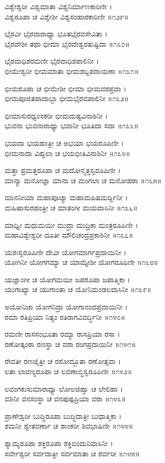 ವಿಶ್ವೇಶ್ವರೀ ವಿಶ್ವಮಾತಾ ವಿಶ್ವನಿರ್ಮಾಣಕಾರಿಣೀ ।\\
ವಿಶ್ವರೂಪಾ ಚ ವಿಶ್ವೇಶೀ ವಿಶ್ವಸಂಹಾರಕಾರಿಣೀ ॥೧೨೯॥

ಭೈರವೀ ಭೈರವಾರಾಧ್ಯಾ ಭೂತಭೈರವಸೇವಿತಾ ।\\
ಭೈರವೇಶೀ ತಥಾ ಭೀಮಾ ಭೈರವೇಶ್ವರತುಷ್ಟಿದಾ ॥೧೩೦॥

ಭೈರವಾಧಿಶರಮಣೀ ಭೈರವಾಧಿಶಪಾಲಿನೀ ।\\
ಭೀಮೇಶ್ವರೀ ಭೀಮಮಾತಾ ಭೀಮಶಬ್ದಪರಾಯಣಾ ॥೧೩೧॥

ಭೀಮರೂಪಾ ಚ ಭೀಮೇಶೀ ಭೀಮಾ ಭೀಮವರಪ್ರದಾ ।\\
ಭೀಮಪೂಜಿತಪಾದಾಬ್ಜಾ ಭೀಮಭೈರವಪಾಲಿನೀ ॥೧೩೨॥

ಭೀಮಾಸುರಧ್ವಂಸಕರೀ ಭೀಮದುಷ್ಟವಿನಾಶಿನೀ ।\\
ಭುವನಾ ಭುವನಾರಾಧ್ಯಾ ಭವಾನೀ ಭೂತಿದಾ ಸದಾ ॥೧೩೩॥

ಭಯದಾ ಭಯಹಂತ್ರೀ ಚ ಅಭಯಾ ಭಯರೂಪಿಣೀ ।\\
ಭೀಮನಾದಾ ವಿಹ್ವಲಾ ಚ ಭಯಭೀತಿವಿನಾಶಿನೀ ॥೧೩೪॥

ಮತ್ತಾ ಪ್ರಮತ್ತರೂಪಾ ಚ ಮದೋನ್ಮತ್ತಸ್ವರೂಪಿಣೀ ।\\
ಮಾನ್ಯಾ ಮನೋಜ್ಞಾ ಮಾನಾ ಚ ಮಂಗಲಾ ಚ ಮನೋಹರಾ ॥೧೩೫॥

ಮಾನನೀಯಾ ಮಹಾಪೂಜ್ಯಾ ಮಹಾಮಹಿಷಮರ್ದ್ದಿನೀ ।\\
ಮಹಿಷಾಸುರಹಂತ್ರೀ ಚ ಮಾತಂಗೀ ಮಯವಾಸಿನೀ ॥೧೩೬॥

ಮಾಧ್ವೀ ಮಧುಮಯೀ ಮುದ್ರಾ ಮುದ್ರಿಕಾ ಮಂತ್ರರೂಪಿಣೀ ।\\
ಮಹಾವಿಶ್ವೇಶ್ವರೀ ದೂತೀ ಮೌಲಿಚಂದ್ರಪ್ರಕಾಶಿನೀ ॥೧೩೭॥

ಯಶಃಸ್ವರೂಪಿಣೀ ದೇವೀ ಯೋಗಮಾರ್ಗಪ್ರದಾಯಿನೀ ।\\
ಯೋಗಿನೀ ಯೋಗಗಮ್ಯಾ ಚ ಯಾಮ್ಯೇಶೀ ಯೋಗರೂಪಿಣೀ ॥೧೩೮॥

ಯಜ್ಞಾಂಗೀ ಚ ಯೋಗಮಯೀ ಜಪರೂಪಾ ಜಪಾತ್ಮಿಕಾ ।\\
ಯುಗಾಖ್ಯಾ ಚ ಯುಗಾಂತಾ ಚ ಯೋನಿಮಂಡಲವಾಸಿನೀ ॥೧೩೯॥

ಅಯೋನಿಜಾ ಯೋಗನಿದ್ರಾ ಯೋಗಾನಂದಪ್ರದಾಯಿನೀ ।\\
ರಮಾ ರತಿಪ್ರಿಯಾ ನಿತ್ಯಂ ರತಿರಾಗವಿವರ್ದ್ಧಿನೀ ॥೧೪೦॥

ರಮಣೀ ರಾಸಸಂಭೂತಾ ರಮ್ಯಾ ರಾಸಪ್ರಿಯಾ ರಸಾ ।\\
ರಣೋತ್ಕಂಠಾ ರಣಸ್ಥಾ ಚ ವರಾ ರಂಗಪ್ರದಾಯಿನೀ ॥೧೪೧॥

ರೇವತೀ ರಣಜೈತ್ರೀ ಚ ರಸೋದ್ಭೂತಾ ರಣೋತ್ಸವಾ ।\\
ಲತಾ ಲಾವಣ್ಯರೂಪಾ ಚ ಲವಣಾಬ್ಧಿಸ್ವರೂಪಿಣೀ ॥೧೪೨॥

ಲವಂಗಕುಸುಮಾರಾಧ್ಯಾ ಲೋಲಜಿಹ್ವಾ ಚ ಲೇಲಿಹಾ ।\\
ವಶಿನೀ ವನಸಂಸ್ಥಾ ಚ ವನಪುಷ್ಪಪ್ರಿಯಾ ವರಾ ॥೧೪೩॥

ಪ್ರಾಣೇಶ್ವರೀ ಬುದ್ಧಿರೂಪಾ ಬುದ್ಧಿದಾತ್ರೀ ಬುಧಾತ್ಮಿಕಾ ।\\
ಶಮನೀ ಶ್ವೇತವರ್ಣಾ ಚ ಶಾಂಕರೀ ಶಿವಭಾಷಿಣೀ ॥೧೪೪॥

ಶ್ಯಾಮ್ಯರೂಪಾ ಶಕ್ತಿರೂಪಾ ಶಕ್ತಿಬಿಂದುನಿವಾಸಿನೀ ।\\
ಸರ್ವೇಶ್ವರೀ ಸರ್ವದಾತ್ರೀ ಸರ್ವಮಾತಾ ಚ ಶರ್ವರೀ ॥೧೪೫॥

